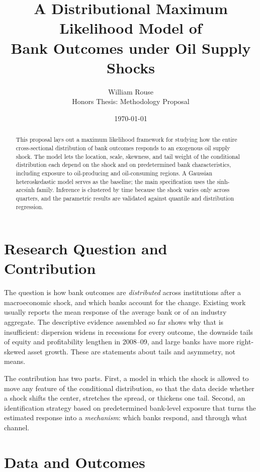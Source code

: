 \documentclass[11pt]{article}
\title{A Distributional Maximum Likelihood Model of\\
       Bank Outcomes under Oil Supply Shocks}
\author{William Rouse\\ \small Honors Thesis: Methodology Proposal}
\date{\today}
\begin{document}
\maketitle

\begin{abstract}
\noindent
This proposal lays out a maximum likelihood framework for studying how the entire cross-sectional distribution of bank outcomes responds to an exogenous oil supply shock. The model lets the location, scale, skewness, and tail weight of the conditional distribution each depend on the shock and on predetermined bank characteristics, including exposure to oil-producing and oil-consuming regions. A Gaussian heteroskedastic model serves as the baseline; the main specification uses the sinh-arcsinh family. Inference is clustered by time because the shock varies only across quarters, and the parametric results are validated against quantile and distribution regression.
\end{abstract}

\section{Research Question and Contribution}

The question is how bank outcomes are \emph{distributed} across institutions after a macroeconomic shock, and which banks account for the change. Existing work usually reports the mean response of the average bank or of an industry aggregate. The descriptive evidence assembled so far shows why that is insufficient: dispersion widens in recessions for every outcome, the downside tails of equity and profitability lengthen in 2008--09, and large banks have more right-skewed asset growth. These are statements about tails and asymmetry, not means.

The contribution has two parts. First, a model in which the shock is allowed to move any feature of the conditional distribution, so that the data decide whether a shock shifts the center, stretches the spread, or thickens one tail. Second, an identification strategy based on predetermined bank-level exposure that turns the estimated response into a \emph{mechanism}: which banks respond, and through what channel.

\section{Data and Outcomes}
\end{document}
